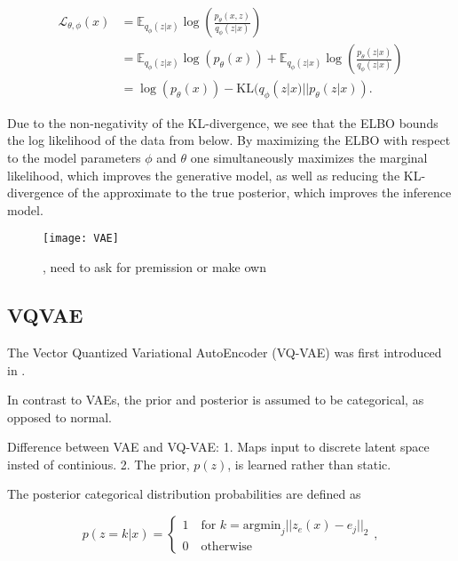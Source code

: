 \documentclass[../../thesis.tex]{subfiles}
\begin{document}
\begin{equation}
    \begin{aligned}
        \label{eq:ELBO}
        \mathcal{L}_{\theta,\phi}(x) 
        &= \mathbb{E}_{q_\phi(z|x)} \log \left( \frac{p_\theta(x,z)}{q_\phi(z|x)}\right) \\ 
        &=  \mathbb{E}_{q_\phi(z|x)} \log \left( p_\theta(x)\right) + \mathbb{E}_{q_\phi(z|x)} \log \left( \frac{p_\theta(z|x)}{q_\phi(z|x)}\right) \\
        &= \log \left( p_\theta(x)\right) - \textrm{KL}(q_\phi(z|x)|| p_\theta(z|x)).
    \end{aligned}
\end{equation}

Due to the non-negativity of the KL-divergence, we see that the ELBO bounds the log likelihood of the data from below. By maximizing the ELBO with respect to the model parameters $\phi$ and $\theta$ one simultaneously maximizes the marginal likelihood, which improves the generative model, as well as reducing the KL-divergence of the approximate to the true posterior, which improves the inference model.



\begin{figure}[h]
    \texttt{[image: VAE]}
    \centering  
    \caption{\cite{VAE}, need to ask for premission or make own}  
\end{figure}

\subsection{VQVAE}
The Vector Quantized Variational AutoEncoder (VQ-VAE) was first introduced in \cite{VQVAE}. 

In contrast to VAEs, the prior and posterior is assumed to be categorical, as opposed to normal. 

Difference between VAE and VQ-VAE: 1. Maps input to discrete latent space insted of continious. 2. The prior, $p(z)$, is learned rather than static.

The posterior categorical distribution probabilities are defined as

\begin{equation}
    p(z=k | x) = 
    \begin{cases} 
        1 \quad \text{for }k = \textrm{argmin}_j||z_e(x) - e_j||_2 \\
        0 \quad \text{otherwise}
    \end{cases},
\end{equation}
\end{document}

